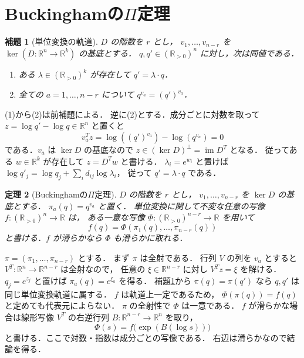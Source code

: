 \documentclass[a5paper,10pt,onecolumn]{jsarticle}
\makeatletter
\theoremstyle{mathnotetheorem}
\newtheorem{theorem}{定理}[section]
\newtheorem{lemma}[theorem]{補題}
\renewcommand{\proofname}{証明}
\renewenvironment{proof}[1][\proofname]{%
  \par\pushQED{\qed}\normalfont\topsep4\p@\@plus2\p@\relax
  \trivlist\item[\hskip\labelsep\bfseries #1]\ignorespaces
}{\popQED\endtrivlist\@endpefalse}
\makeatother
\begin{document}
\section{Buckinghamの$\Pi$定理}
\begin{lemma}[単位変換の軌道]\label{lem:orbit}
$D$ の階数を $r$ とし，
$v_1,\ldots,v_{n-r}$ を
$\ker(D:\mathbb R^n\to\mathbb R^k)$ の基底とする．
$q,q'\in(\mathbb R_{>0})^n$ に対し，次は同値である．
\begin{enumerate}
\item ある $\lambda\in(\mathbb R_{>0})^k$ が存在して
 $q'=\lambda\cdot q$．
\item 全ての $a=1,\ldots,n-r$ について
 $q^{v_a}=(q')^{v_a}$．
\end{enumerate}
\end{lemma}
\begin{proof}
(1)から(2)は前補題による．
逆に(2)とする．成分ごとに対数を取って
$z=\log q'-\log q\in\mathbb R^n$ と置くと
\[
 v_a^Tz=\log((q')^{v_a})-\log(q^{v_a})=0
\]
である．$v_a$ は $\ker D$ の基底なので
$z\in(\ker D)^\perp=\operatorname{im}D^T$ となる．
従ってある $w\in\mathbb R^k$ が存在して
$z=D^Tw$ と書ける．
$\lambda_i=e^{w_i}$ と置けば
$\log q'_j=\log q_j+\sum_i d_{ij}\log\lambda_i$，
従って $q'=\lambda\cdot q$ である．
\end{proof}
\begin{theorem}[Buckinghamの$\Pi$定理]\label{thm:pi}
$D$ の階数を $r$ とし，
$v_1,\ldots,v_{n-r}$ を $\ker D$ の基底とする．
$\pi_a(q)=q^{v_a}$ と置く．
単位変換に関して不変な任意の写像
$f:(\mathbb R_{>0})^n\to\mathbb R$ は，
ある一意な写像
$\Phi:(\mathbb R_{>0})^{n-r}\to\mathbb R$ を用いて
\[
 f(q)=\Phi(\pi_1(q),\ldots,\pi_{n-r}(q))
\]
と書ける．$f$ が滑らかなら $\Phi$ も滑らかに取れる．
\end{theorem}
\begin{proof}
$\pi=(\pi_1,\ldots,\pi_{n-r})$ とする．
まず $\pi$ は全射である．
行列 $V$ の列を $v_a$ とすると
$V^T:\mathbb R^n\to\mathbb R^{n-r}$ は全射なので，
任意の $\xi\in\mathbb R^{n-r}$ に対し
$V^Tz=\xi$ を解ける．
$q_j=e^{z_j}$ と置けば
$\pi_a(q)=e^{\xi_a}$ を得る．
補題\ref{lem:orbit}から $\pi(q)=\pi(q')$ なら
$q,q'$ は同じ単位変換軌道に属する．
$f$ は軌道上一定であるため，
$\Phi(\pi(q))=f(q)$ と定めても代表元によらない．
$\pi$ の全射性で $\Phi$ は一意である．
$f$ が滑らかな場合は線形写像 $V^T$ の右逆行列
$B:\mathbb R^{n-r}\to\mathbb R^n$ を取り，
\[
 \Phi(s)=f\bigl(\exp(B(\log s))\bigr)
\]
と書ける．ここで対数・指数は成分ごとの写像である．
右辺は滑らかなので結論を得る．
\end{proof}
\end{document}
